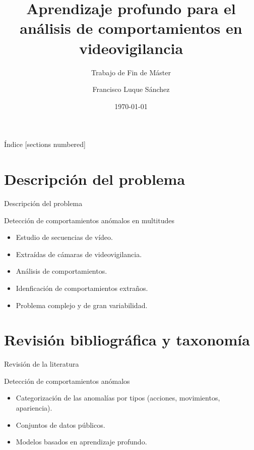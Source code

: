 \documentclass[10pt]{beamer}
\title{Aprendizaje profundo para el análisis de comportamientos en
  videovigilancia}
\subtitle{Trabajo de Fin de Máster}
\date{\today}
\author{Francisco Luque Sánchez}
\institute{Universidad de Granada - Máster en Ciencia de Datos
  e Ingeniería de Computadores}
\begin{document}
\maketitle

\begin{frame}{Índice}
  [sections numbered]
  \tableofcontents[hideallsubsections]
\end{frame}

\section{Descripción del problema}

\begin{frame}{Descripción del problema}
  \begin{block}{Detección de comportamientos anómalos en multitudes}
    \begin{itemize}
    \item Estudio de secuencias de vídeo.
    \item Extraídas de cámaras de videovigilancia.
    \item Análisis de comportamientos.
    \item Idenficación de comportamientos extraños.
    \item Problema complejo y de gran variabilidad.
    \end{itemize}
  \end{block}
\end{frame}

\section{Revisión bibliográfica y taxonomía}

\begin{frame}{Revisión de la literatura}
  \begin{block}{Detección de comportamientos anómalos}
    \begin{itemize}
    \item Categorización de las anomalías por tipos (acciones,
      movimientos, apariencia).
    \item Conjuntos de datos públicos.
    \item Modelos basados en aprendizaje profundo.
    \end{itemize}
  \end{block}
\end{frame}
\end{document}
